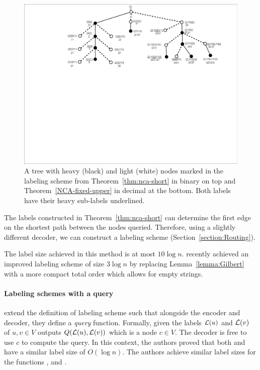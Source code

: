 					\begin{figure}[!ht] 
				\centering
				\includegraphics[width=120mm]{./Figures/Esbenscrazy.pdf}
				\caption{A tree with heavy (black) and light (white) nodes marked in the labeling scheme from Theorem~\ref{thm:nca-short} in binary on top and Theorem~\ref{NCA-fixed-upper} in decimal at the bottom. Both labels have their heavy sub-labels underlined.}
				\label{fig:NCAESBEN}
			\end{figure}
						
The labels constructed in Theorem~\ref{thm:nca-short}  can determine the first edge on the shortest path between the nodes queried. Therefore, using a slightly different decoder, we can construct a \routing labeling scheme (Section~\ref{section:Routing}).

The label size achieved in this method is at most $10 \log n$.
  recently achieved an improved labeling scheme of size $3 \log n$ by replacing  Lemma~\ref{lemma:Gilbert} with a more compact  total order which allows for empty strings.

\paragraph{Labeling schemes with a query}
	   extend  the definition of labeling scheme such that alongside the encoder and decoder, they define a \emph{query} function.
	Formally, given the labels $ \mathcal{L}(u)$ and  $ \mathcal{L}(v)$  of $u,v  \in  V $  outputs $Q( \mathcal{L}(u),  \mathcal{L}(v))$ which is a node $ c \in V$.
	The decoder is free to use $c$ to compute the query.
	In this context, the authors proved that both  \NCAl and  \NCAf have a similar label size of  $O(\log n)$.
	The authors achieve similar label sizes for the functions \distance, \routing and \flow.
		
